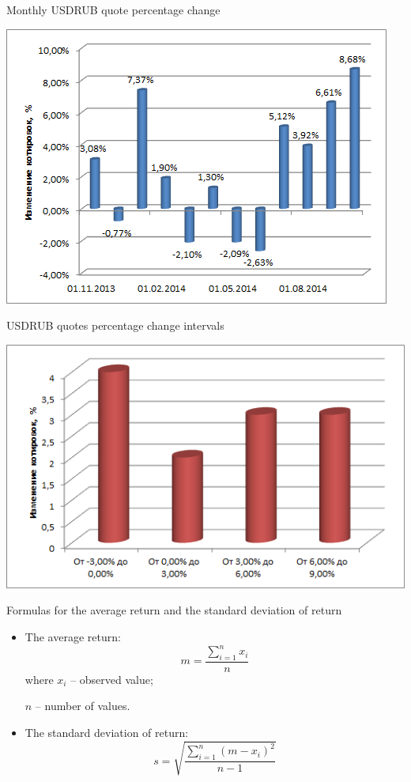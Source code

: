 \documentclass[_international_finance_p1.tex]{subfiles}
\begin{document}
\begin{frame}{Monthly USDRUB quote percentage change}
\begin{center}
\includegraphics[scale=0.8]{img/usdrubdeltaperc}
\end{center}
\end{frame}
\begin{frame}{USDRUB quotes percentage change intervals}
\begin{center}
\includegraphics[scale=0.8]{img/usdrubquotesintervals}
\end{center}
\end{frame}
\begin{frame}{Formulas for the average return and the standard deviation of return}
\begin{itemize}[<+->]
\item
The average return:
$$m=\frac{\sum_{i=1}^n x_i}{n}$$
where $x_i$ – observed value;

$n$ – number of values.
\item
The standard deviation of return:
$$s=\sqrt{\frac{\sum_{i=1}^n (m-x_i)^2}{n-1}}$$
\end{itemize}
\end{frame}
\end{document}

